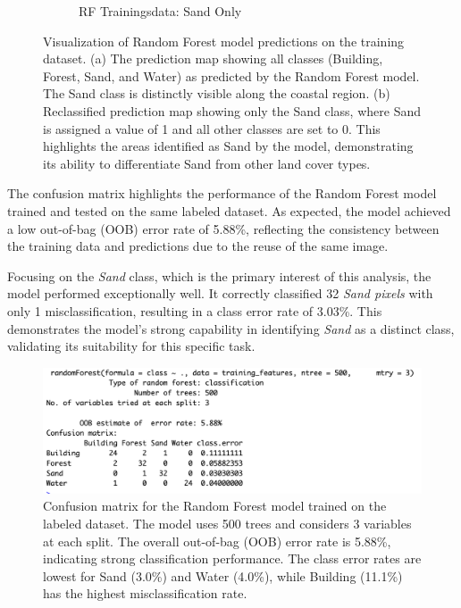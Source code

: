 \documentclass[a4paper,12pt]{article}
\begin{document}
\begin{figure}[H]
\begin{subfigure}[b]{0.48\linewidth}
        \caption{RF Trainingsdata: Sand Only}
        \label{fig:rf_training_sand}
    \end{subfigure}
    \caption[Visualization of Random Forest model predictions on the training dataset]{Visualization of Random Forest model predictions on the training dataset.
(a) The prediction map showing all classes (Building, Forest, Sand, and Water) as predicted by the Random Forest model. The Sand class is distinctly visible along the coastal region.
(b) Reclassified prediction map showing only the Sand class, where Sand is assigned a value of 1 and all other classes are set to 0. This highlights the areas identified as Sand by the model, demonstrating its ability to differentiate Sand from other land cover types.}
    \label{fig:rf_comparison_training}
\end{figure}

The confusion matrix highlights the performance of the Random Forest model trained and tested on the same labeled dataset. As expected, the model achieved a low out-of-bag (OOB) error rate of 5.88\%, reflecting the consistency between the training data and predictions due to the reuse of the same image.

Focusing on the \textit{Sand} class, which is the primary interest of this analysis, the model performed exceptionally well. It correctly classified 32 \textit{Sand pixels} with only 1 misclassification, resulting in a class error rate of 3.03\%. This demonstrates the model’s strong capability in identifying \textit{Sand} as a distinct class, validating its suitability for this specific task.
\begin{figure}[H]
    \centering
    \includegraphics[width=1.0\linewidth]{Random_Forest_Model/Random Forest Training Data Matrix.png}
    \caption[Confusion matrix for the Random Forest model trained on the labeled dataset]{Confusion matrix for the Random Forest model trained on the labeled dataset. The model uses 500 trees and considers 3 variables at each split. The overall out-of-bag (OOB) error rate is 5.88\%, indicating strong classification performance. The class error rates are lowest for Sand (3.0\%) and Water (4.0\%), while Building (11.1\%) has the highest misclassification rate.}
    \label{fig:rf_traing}
\end{figure}
\end{document}
